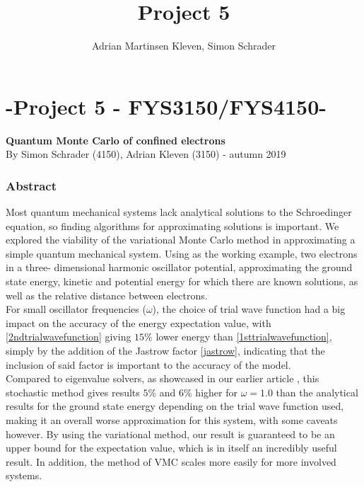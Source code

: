 \documentclass[10pt,a4paper]{article}
\author{Adrian Martinsen Kleven, Simon Schrader}
\title{Project 5}
\begin{document}
\part*{-Project 5 - FYS3150/FYS4150-
}
{\large \textbf{Quantum Monte Carlo of confined electrons}}\\
{\large By Simon Schrader (4150), Adrian Kleven (3150) - autumn 2019
}
\tableofcontents

\listoffigures
\listoftables


\clearpage

\section{Abstract}
Most quantum mechanical systems lack analytical solutions to the Schroedinger equation, so finding algorithms for approximating solutions is important. We explored the viability of the variational Monte Carlo method in approximating a simple quantum mechanical system. Using as the working example, two electrons in a three- dimensional harmonic oscillator potential, approximating the ground state energy, kinetic and potential energy for which there are known solutions\cite{Project2}, as well as the relative distance between electrons.\\
For small oscillator frequencies ($\omega$), the choice of trial wave function had a big impact on the accuracy of the energy expectation value, with \eqref{2ndtrialwavefunction} giving $15\%$ lower energy than \eqref{1sttrialwavefunction}, simply by the addition of the Jastrow factor \eqref{jastrow}, indicating that the inclusion of said factor is important to the accuracy of the model.\\Compared to eigenvalue solvers, as showcased in our earlier article \cite{Project2}, this stochastic method gives results $5\%$ and $6\%$ higher for $\omega=1.0$ than the analytical results for the ground state energy depending on the trial wave function used,  making it an overall worse approximation for this system, with some caveats however. By using the variational method, our result is guaranteed to be an upper bound for the expectation value, which is in itself an incredibly useful result. In addition, the method of VMC scales more easily for more involved systems.
\end{document}
